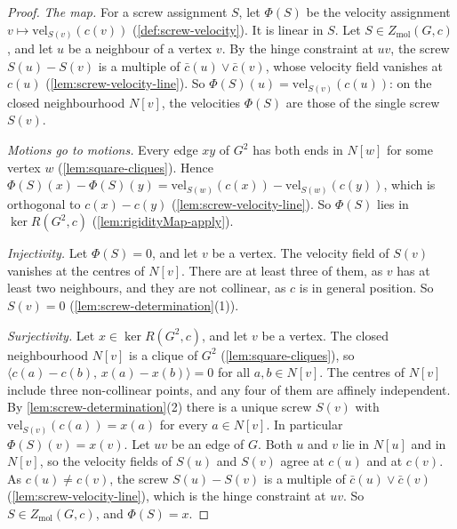 \begin{proof}
  \leanok
  \emph{The map.} For a screw assignment $S$, let $\Phi(S)$ be the
  velocity assignment $v \mapsto \mathrm{vel}_{S(v)}(c(v))$
  (\cref{def:screw-velocity}). It is linear in $S$. Let
  $S \in Z_{\mathrm{mol}}(G, c)$, and let $u$ be a neighbour of a vertex
  $v$. By the hinge constraint at $uv$, the screw $S(u) - S(v)$ is a
  multiple of $\bar c(u) \vee \bar c(v)$, whose velocity field vanishes
  at $c(u)$ (\cref{lem:screw-velocity-line}). So
  $\Phi(S)(u) = \mathrm{vel}_{S(v)}(c(u))$: on the closed neighbourhood
  $N[v]$, the velocities $\Phi(S)$ are those of the single screw $S(v)$.

  \emph{Motions go to motions.} Every edge $xy$ of $G^2$ has both ends in
  $N[w]$ for some vertex $w$ (\cref{lem:square-cliques}). Hence
  $\Phi(S)(x) - \Phi(S)(y) =
  \mathrm{vel}_{S(w)}(c(x)) - \mathrm{vel}_{S(w)}(c(y))$, which is
  orthogonal to $c(x) - c(y)$ (\cref{lem:screw-velocity-line}). So
  $\Phi(S)$ lies in $\ker R(G^2, c)$ (\cref{lem:rigidityMap-apply}).

  \emph{Injectivity.} Let $\Phi(S) = 0$, and let $v$ be a vertex. The
  velocity field of $S(v)$ vanishes at the centres of $N[v]$. There are at
  least three of them, as $v$ has at least two neighbours, and they are
  not collinear, as $c$ is in general position. So $S(v) = 0$
  (\cref{lem:screw-determination}(1)).

  \emph{Surjectivity.} Let $x \in \ker R(G^2, c)$, and let $v$ be a
  vertex. The closed neighbourhood $N[v]$ is a clique of $G^2$
  (\cref{lem:square-cliques}), so
  $\langle c(a) - c(b),\, x(a) - x(b) \rangle = 0$ for all
  $a, b \in N[v]$. The centres of $N[v]$ include three non-collinear
  points, and any four of them are affinely independent. By
  \cref{lem:screw-determination}(2) there is a unique screw $S(v)$ with
  $\mathrm{vel}_{S(v)}(c(a)) = x(a)$ for every $a \in N[v]$. In particular
  $\Phi(S)(v) = x(v)$. Let $uv$ be an edge of $G$. Both $u$ and $v$ lie in
  $N[u]$ and in $N[v]$, so the velocity fields of $S(u)$ and $S(v)$ agree
  at $c(u)$ and at $c(v)$. As $c(u) \neq c(v)$, the screw $S(u) - S(v)$
  is a multiple of $\bar c(u) \vee \bar c(v)$
  (\cref{lem:screw-velocity-line}), which is the hinge constraint at $uv$.
  So $S \in Z_{\mathrm{mol}}(G, c)$, and $\Phi(S) = x$.


\end{proof}
